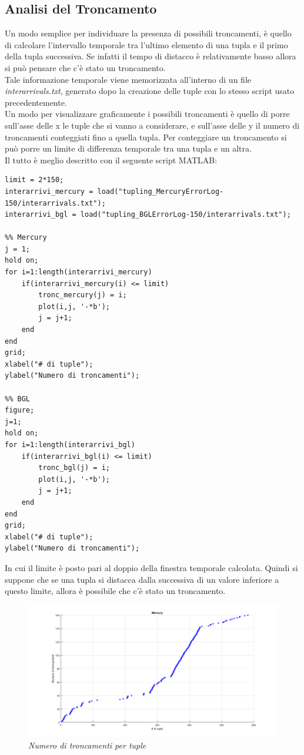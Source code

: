 \subsection{Analisi del Troncamento}
Un modo semplice per individuare la presenza di possibili troncamenti, è quello di calcolare l'intervallo temporale tra l'ultimo elemento di una tupla e il primo della tupla successiva. Se infatti il tempo di distacco è relativamente basso allora si può pensare che c'è stato un troncamento.
\\Tale informazione temporale viene memorizzata all'interno di un file \textit{interarrivals.txt}, generato dopo la creazione delle tuple con lo stesso script usato precedentemente.
\\Un modo per visualizzare graficamente i possibili troncamenti è quello di porre sull'asse delle x le tuple che si vanno a considerare, e sull'asse delle y il numero di troncamenti conteggiati fino a quella tupla. Per conteggiare un troncamento si può porre un limite di differenza temporale tra una tupla e un altra.
\\Il tutto è meglio descritto con il seguente script MATLAB:
\begin{verbatim}
limit = 2*150;
interarrivi_mercury = load("tupling_MercuryErrorLog-150/interarrivals.txt");
interarrivi_bgl = load("tupling_BGLErrorLog-150/interarrivals.txt");

%% Mercury
j = 1;
hold on;
for i=1:length(interarrivi_mercury)
	if(interarrivi_mercury(i) <= limit)
		tronc_mercury(j) = i;
		plot(i,j, '-*b');
		j = j+1;
	end
end
grid;
xlabel("# di tuple");
ylabel("Numero di troncamenti");

%% BGL
figure;
j=1;
hold on;
for i=1:length(interarrivi_bgl)
	if(interarrivi_bgl(i) <= limit)
		tronc_bgl(j) = i;
		plot(i,j, '-*b');
		j = j+1;
	end 
end
grid;
xlabel("# di tuple");
ylabel("Numero di troncamenti");
\end{verbatim}
In cui il limite è posto pari al doppio della finestra temporale calcolata. Quindi si suppone che se una tupla si distacca dalla successiva di un valore inferiore a questo limite, allora è possibile che c'è stato un troncamento.
\begin{figure}[H]
	\centering
	\includegraphics[width=\textwidth]{img/hw6/troncamento_mercury.png}
	\caption{\textit{Numero di troncamenti per tuple}}
\end{figure}
